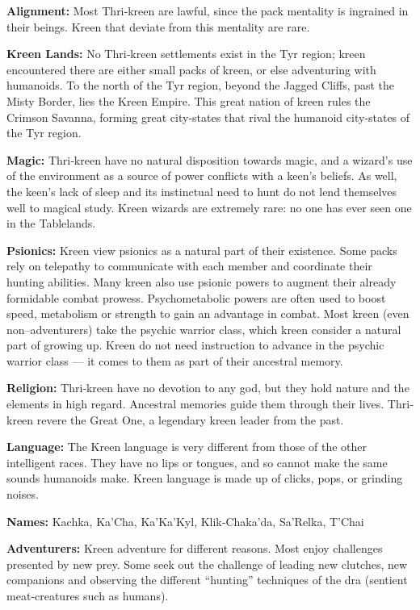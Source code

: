 \textbf{Alignment:} Most Thri‐kreen are lawful, since the pack mentality is ingrained in their beings. Kreen that deviate from this mentality are rare.

\textbf{Kreen Lands:} No Thri‐kreen settlements exist in the Tyr region; kreen encountered there are either small packs of kreen, or else adventuring with humanoids. To the north of the Tyr region, beyond the Jagged Cliffs, past the Misty Border, lies the Kreen Empire. This great nation of kreen rules the Crimson Savanna, forming great city‐states that rival the humanoid city‐states of the Tyr region.

\textbf{Magic:} Thri‐kreen have no natural disposition towards magic, and a wizard’s use of the environment as a source of power conflicts with a keen’s beliefs. As well, the keen’s lack of sleep and its instinctual need to hunt do not lend themselves well to magical study. Kreen wizards are extremely rare: no one has ever seen one in the Tablelands.

\textbf{Psionics:} Kreen view psionics as a natural part of their existence. Some packs rely on telepathy to communicate with each member and coordinate their hunting abilities. Many kreen also use psionic powers to augment their already formidable combat prowess. Psychometabolic powers are often used to boost speed, metabolism or strength to gain an advantage in combat. Most kreen (even non–adventurers) take the psychic warrior class, which kreen consider a natural part of growing up. Kreen do not need instruction to advance in the psychic warrior class — it comes to them as part of their ancestral memory.

\textbf{Religion:} Thri‐kreen have no devotion to any god, but they hold nature and the elements in high regard. Ancestral memories guide them through their lives. Thri‐kreen revere the Great One, a legendary kreen leader from the past.

\textbf{Language:} The Kreen language is very different from those of the other intelligent races. They have no lips or tongues, and so cannot make the same sounds humanoids make. Kreen language is made up of clicks, pops, or grinding noises.

\textbf{Names:} Kachka, Ka’Cha, Ka’Ka’Kyl, Klik‐Chaka’da, Sa’Relka, T’Chai

\textbf{Adventurers:} Kreen adventure for different reasons. Most enjoy challenges presented by new prey. Some seek out the challenge of leading new clutches, new companions and observing the different “hunting” techniques of the dra (sentient meat‐creatures such as humans).


